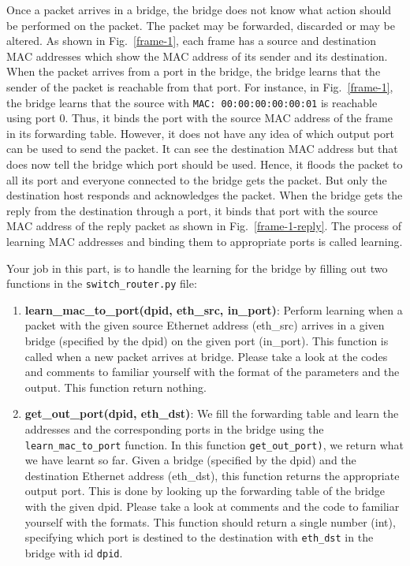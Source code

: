 \documentclass[11pt]{article}
\begin{document}

Once a packet arrives in a bridge, the bridge does not know what action should be performed on the packet. The packet may be forwarded, discarded or may be altered. As shown in Fig.~\ref{frame-1}, each frame has a source and destination MAC addresses which show the MAC address of its sender and its destination. When the packet arrives from a port in the bridge, the bridge learns that the sender of the packet is reachable from that port. For instance, in Fig.~\ref{frame-1}, the bridge learns that the source with \texttt{MAC: 00:00:00:00:00:01} is reachable using port 0. Thus, it binds the port with the source MAC address of the frame in its forwarding table. However, it does not have any idea of which output port can be used to send the packet. It can see the destination MAC address but that does now tell the bridge which port should be used. Hence, it floods the packet to all its port and everyone connected to the bridge gets the packet. But only the destination host responds and acknowledges the packet. When the bridge gets the reply from the destination through a port, it binds that port with the source MAC address of the reply packet as shown in Fig.~\ref{frame-1-reply}. The process of learning MAC addresses and binding them to appropriate ports is called learning.



Your job in this part, is to handle the learning for the bridge by filling out two functions in the \texttt{switch\_router.py} file:
\begin{enumerate}
    \item \textbf{learn\_mac\_to\_port(dpid, eth\_src, in\_port)}: Perform learning when a packet with the given source Ethernet address (eth\_src) arrives in a given bridge (specified by the dpid) on the given port (in\_port). This function is called when a new packet arrives at bridge. Please take a look at the codes and comments to familiar yourself with the format of the parameters and the output. This function return nothing.

    \item \textbf{get\_out\_port(dpid, eth\_dst)}: We fill the forwarding table and learn the addresses and the corresponding ports in the bridge using the \texttt{learn\_mac\_to\_port} function. In this function \texttt{get\_out\_port)}, we return what we have learnt so far. Given a bridge (specified by the dpid) and the destination Ethernet address (eth\_dst), this function returns the appropriate output port. This is done by looking up the forwarding table of the bridge with the given dpid. Please take a look at comments and the code to familiar yourself with the formats. This function should return a single number (int), specifying which port is destined to the destination with \texttt{eth\_dst} in the bridge with id \texttt{dpid}.

\end{enumerate}
\end{document}
